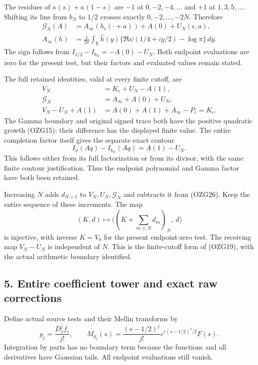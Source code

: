 \documentclass[
  10pt,
  a4paper,
]{article}
\begin{document}
The residues of \(\kappa(s)+\kappa(1-s)\) are \(-1\) at
\(0,-2,-4,\ldots\) and \(+1\) at \(1,3,5,\ldots\). Shifting its line
from \(b_N\) to \(1/2\) crosses exactly \(0,-2,\ldots,-2N\). Therefore
\[
\begin{aligned}
\mathcal G_N(A)&=A_\infty(h_\epsilon(\cdot+a))+A(0)+U_N(\epsilon,a),\\
A_\infty(h)&=\frac1{2\pi}\int_{\mathbb R}\widehat h(y)
\{\Re\psi(1/4+iy/2)-\log\pi\}\,dy .
\end{aligned}
\tag{OZG24}
\] The sign follows from \(I_{1/2}-I_{b_N}=-A(0)-U_N\). Both endpoint
evaluations are zero for the present test, but their factors and
evaluated values remain stated.

The full retained identities, valid at every finite cutoff, are \[
\boxed{\begin{aligned}
V_N&=K_\epsilon+U_N-A(1),\\
\mathcal G_N&=A_\infty+A(0)+U_N,\\
V_N-U_N+A(1)&=A(0)+A(1)+A_\infty-P_\epsilon=K_\epsilon.
\end{aligned}}
\tag{OZG25}
\] The Gamma boundary and original signed trace both have the positive
quadratic growth (OZG15); their difference has the displayed finite
value. The entire completion factor itself gives the separate exact
contour \[
I_\sigma(Aq)-I_{b_N}(Aq)=A(1)-U_N.
\tag{OZG26}
\] This follows either from its full factorization or from its divisor,
with the same finite contour justification. Thus the endpoint polynomial
and Gamma factor have both been retained.

Increasing \(N\) adds \(d_{N+1}\) to \(V_N,U_N,\mathcal G_N\) and
subtracts it from (OZG26). Keep the entire sequence of these increments.
The map \[
(K,d)\longmapsto
\bigl((K+\sum_{m\le N}d_m)_N,\ d\bigr)
\tag{OZG27}
\] is injective, with inverse \(K=V_0\) for the present endpoint-zero
test. The receiving map \(V_N-U_N\) is independent of \(N\). This is the
finite-cutoff form of (OZG19), with the actual arithmetic boundary
identified.

\subsection{5. Entire coefficient tower and exact raw
corrections}\label{entire-coefficient-tower-and-exact-raw-corrections}

Define actual source tests and their Mellin transforms by \[
g_j=\frac{D_v^j f_\epsilon}{j!},\qquad
M_{g_j}(s)=\frac{(s-1/2)^j}{j!}
e^{\epsilon(s-1/2)^2/2}F(s).
\tag{OZG28}
\] Integration by parts has no boundary term because the functions and
all derivatives have Gaussian tails. All endpoint evaluations still
vanish.
\end{document}
